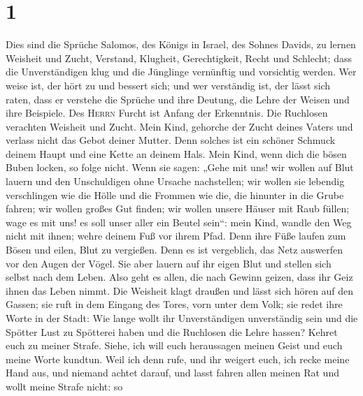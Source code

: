 \hypertarget{section}{%
\section{1}\label{section}}

 Dies sind die Sprüche Salomos, des Königs in Israel, des
Sohnes Davids,  zu lernen Weisheit und Zucht, Verstand,
 Klugheit, Gerechtigkeit, Recht und Schlecht;
 dass die Unverständigen klug und die Jünglinge vernünftig
und vorsichtig werden.  Wer weise ist, der hört zu und
bessert sich; und wer verständig ist, der lässt sich raten,
 dass er verstehe die Sprüche und ihre Deutung, die Lehre
der Weisen und ihre Beispiele.  Des \textsc{Herrn} Furcht
ist Anfang der Erkenntnis. Die Ruchlosen verachten Weisheit und Zucht.
 Mein Kind, gehorche der Zucht deines Vaters und verlass
nicht das Gebot deiner Mutter.  Denn solches ist ein
schöner Schmuck deinem Haupt und eine Kette an deinem Hals.
 Mein Kind, wenn dich die bösen Buben locken, so folge
nicht.  Wenn sie sagen: „Gehe mit uns! wir wollen auf
Blut lauern und den Unschuldigen ohne Ursache nachstellen;
 wir wollen sie lebendig verschlingen wie die Hölle und
die Frommen wie die, die hinunter in die Grube fahren; 
wir wollen großes Gut finden; wir wollen unsere Häuser mit Raub füllen;
 wage es mit uns! es soll unser aller ein Beutel sein``:
 mein Kind, wandle den Weg nicht mit ihnen; wehre deinem
Fuß vor ihrem Pfad.  Denn ihre Füße laufen zum Bösen und
eilen, Blut zu vergießen.  Denn es ist vergeblich, das
Netz auswerfen vor den Augen der Vögel.  Sie aber lauern
auf ihr eigen Blut und stellen sich selbst nach dem Leben.
 Also geht es allen, die nach Gewinn geizen, dass ihr
Geiz ihnen das Leben nimmt.  Die Weisheit klagt draußen
und lässt sich hören auf den Gassen;  sie ruft in dem
Eingang des Tores, vorn unter dem Volk; sie redet ihre Worte in der
Stadt:  Wie lange wollt ihr Unverständigen unverständig
sein und die Spötter Lust zu Spötterei haben und die Ruchlosen die Lehre
hassen?  Kehret euch zu meiner Strafe. Siehe, ich will
euch heraussagen meinen Geist und euch meine Worte kundtun.
 Weil ich denn rufe, und ihr weigert euch, ich recke
meine Hand aus, und niemand achtet darauf,  und lasst
fahren allen meinen Rat und wollt meine Strafe nicht:  so
